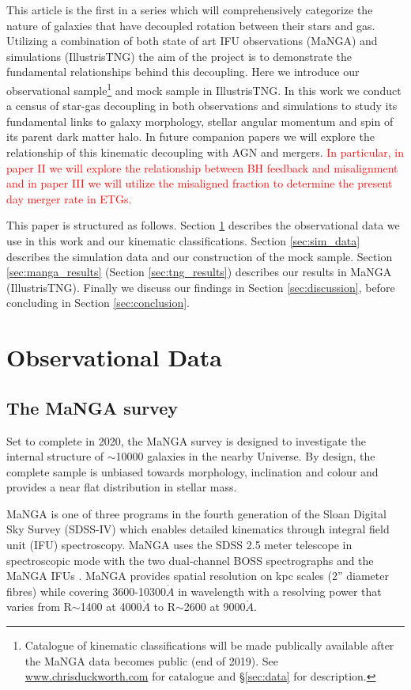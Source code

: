 \documentclass[fleqn,usenatbib]{mnras}
\newcommand{\red}[1]{{\textcolor{red}{#1}}}
\begin{document}
This article is the first in a series which will comprehensively categorize the nature of galaxies that have decoupled rotation between their stars and gas. Utilizing a combination of both state of art IFU observations (MaNGA) and simulations (IllustrisTNG) the aim of the project is to demonstrate the fundamental relationships behind this decoupling. Here we introduce our observational sample\footnote{Catalogue of kinematic classifications will be made publically available after the MaNGA data becomes public (end of 2019). See \url{www.chrisduckworth.com} for catalogue and \S\ref{sec:data} for description.} and mock sample in IllustrisTNG. In this work we conduct a census of star-gas decoupling in both observations and simulations to study its fundamental links to galaxy morphology, stellar angular momentum and spin of its parent dark matter halo. In future companion papers we will explore the relationship of this kinematic decoupling with AGN and mergers. \red{In particular, in paper II we will explore the relationship between BH feedback and misalignment and in paper III we will utilize the misaligned fraction to determine the present day merger rate in ETGs.}

This paper is structured as follows. Section \ref{sec:obs_data} describes the observational data we use in this work and our kinematic classifications. Section \ref{sec:sim_data} describes the simulation data and our construction of the mock sample. Section \ref{sec:manga_results} (Section \ref{sec:tng_results}) describes our results in MaNGA (IllustrisTNG). Finally we discuss our findings in Section \ref{sec:discussion}, before concluding in Section \ref{sec:conclusion}.

\section{Observational Data} \label{sec:obs_data}
\subsection{The MaNGA survey}
Set to complete in 2020, the MaNGA survey is designed to investigate the internal structure of $\sim$10000 galaxies in the nearby Universe. By design, the complete sample is unbiased towards morphology, inclination and colour and provides a near flat distribution in stellar mass. 

MaNGA is one of three programs in the fourth generation of the Sloan Digital Sky Survey (SDSS-IV) which enables detailed kinematics through integral field unit (IFU) spectroscopy. MaNGA uses the SDSS 2.5 meter telescope in spectroscopic mode \citep{gunn2006} with the two dual-channel BOSS spectrographs \citep{smee2013} and the MaNGA IFUs \citep{drory2015}. MaNGA provides spatial resolution on kpc scales (2'' diameter fibres) while covering 3600-10300$\mathring{A}$ in wavelength with a resolving power that varies from R$\sim$1400 at 4000$\mathring{A}$ to R$\sim$2600 at 9000$\mathring{A}$. 
\end{document}
